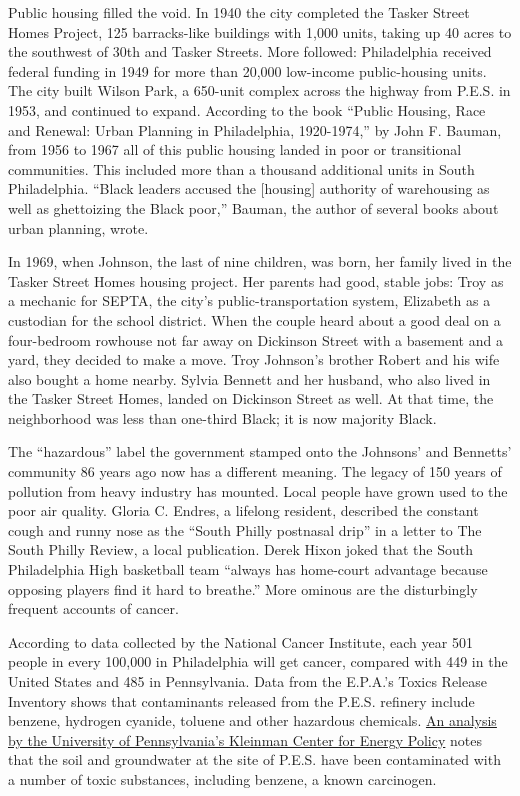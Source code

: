 Public housing filled the void. In 1940 the city completed the Tasker
Street Homes Project, 125 barracks-like buildings with 1,000 units,
taking up 40 acres to the southwest of 30th and Tasker Streets. More
followed: Philadelphia received federal funding in 1949 for more than
20,000 low-income public-housing units. The city built Wilson Park, a
650-unit complex across the highway from P.E.S. in 1953, and continued
to expand. According to the book ``Public Housing, Race and Renewal:
Urban Planning in Philadelphia, 1920-1974,'' by John F. Bauman, from
1956 to 1967 all of this public housing landed in poor or transitional
communities. This included more than a thousand additional units in
South Philadelphia. ``Black leaders accused the {[}housing{]} authority
of warehousing as well as ghettoizing the Black poor,'' Bauman, the
author of several books about urban planning, wrote.

In 1969, when Johnson, the last of nine children, was born, her family
lived in the Tasker Street Homes housing project. Her parents had good,
stable jobs: Troy as a mechanic for SEPTA, the city's
public-transportation system, Elizabeth as a custodian for the school
district. When the couple heard about a good deal on a four-bedroom
rowhouse not far away on Dickinson Street with a basement and a yard,
they decided to make a move. Troy Johnson's brother Robert and his wife
also bought a home nearby. Sylvia Bennett and her husband, who also
lived in the Tasker Street Homes, landed on Dickinson Street as well. At
that time, the neighborhood was less than one-third Black; it is now
majority Black.

The ``hazardous'' label the government stamped onto the Johnsons' and
Bennetts' community 86 years ago now has a different meaning. The legacy
of 150 years of pollution from heavy industry has mounted. Local people
have grown used to the poor air quality. Gloria C. Endres, a lifelong
resident, described the constant cough and runny nose as the ``South
Philly postnasal drip'' in a letter to The South Philly Review, a local
publication. Derek Hixon joked that the South Philadelphia High
basketball team ``always has home-court advantage because opposing
players find it hard to breathe.'' More ominous are the disturbingly
frequent accounts of cancer.

According to data collected by the National Cancer Institute, each year
501 people in every 100,000 in Philadelphia will get cancer, compared
with 449 in the United States and 485 in Pennsylvania. Data from the
E.P.A.'s Toxics Release Inventory shows that contaminants released from
the P.E.S. refinery include benzene, hydrogen cyanide, toluene and other
hazardous chemicals.
\href{https://kleinmanenergy.upenn.edu/paper/beyond-bankruptcy}{An
analysis by the University of Pennsylvania's Kleinman Center for Energy
Policy} notes that the soil and groundwater at the site of P.E.S. have
been contaminated with a number of toxic substances, including benzene,
a known carcinogen.

